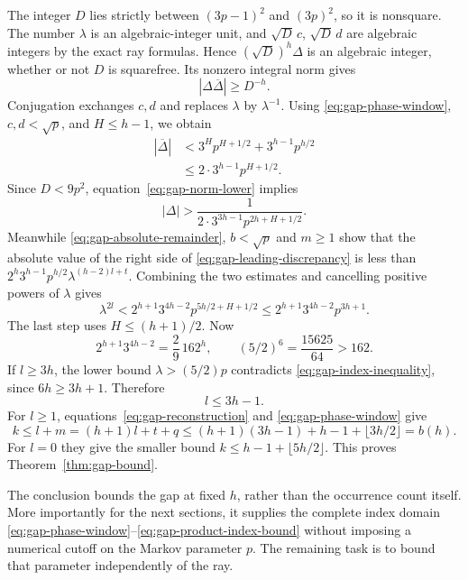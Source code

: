 The integer $D$ lies strictly between $(3p-1)^2$ and $(3p)^2$, so it
is nonsquare. The number $\lambda$ is an algebraic-integer unit, and
$\sqrt D\,c$, $\sqrt D\,d$ are algebraic integers by the exact ray
formulas. Hence $(\sqrt D)^h\Delta$ is an algebraic integer, whether
or not $D$ is squarefree. Its nonzero integral norm gives
\begin{equation}\label{eq:gap-norm-lower}
 |\Delta\overline\Delta|\geqslant D^{-h}.
\end{equation}
Conjugation exchanges $c,d$ and replaces $\lambda$ by $\lambda^{-1}$.
Using \eqref{eq:gap-phase-window}, $c,d<\sqrt p$, and
$H\leqslant h-1$, we obtain
\begin{align*}
 |\overline\Delta|
 &<3^H p^{H+1/2}+3^{h-1}p^{h/2}\\
 &\leqslant2\cdot3^{h-1}p^{H+1/2}.
\end{align*}
Since $D<9p^2$, equation~\eqref{eq:gap-norm-lower} implies
\begin{equation}\label{eq:gap-discrepancy-lower}
 |\Delta|>
 \frac1{2\cdot3^{3h-1}p^{2h+H+1/2}}.
\end{equation}
Meanwhile \eqref{eq:gap-absolute-remainder}, $b<\sqrt p$ and
$m\geqslant1$ show that the absolute value of the right side of
\eqref{eq:gap-leading-discrepancy} is less than
$2^h3^{h-1}p^{h/2}\lambda^{(h-2)l+t}$. Combining the two estimates
and cancelling positive powers of $\lambda$ gives
\begin{equation}\label{eq:gap-index-inequality}
 \lambda^{2l}
 <2^{h+1}3^{4h-2}p^{5h/2+H+1/2}
 \leqslant2^{h+1}3^{4h-2}p^{3h+1}.
\end{equation}
The last step uses $H\leqslant(h+1)/2$. Now
$$
 2^{h+1}3^{4h-2}=\frac29\,162^h,
 \qquad (5/2)^6=\frac{15625}{64}>162.
$$
If $l\geqslant3h$, the lower bound $\lambda>(5/2)p$ contradicts
\eqref{eq:gap-index-inequality}, since $6h\geqslant3h+1$. Therefore
\begin{equation}\label{eq:gap-product-index-bound}
 l\leqslant3h-1.
\end{equation}
For $l\geqslant1$, equations~\eqref{eq:gap-reconstruction} and
\eqref{eq:gap-phase-window} give
$$
 k\leqslant l+m=(h+1)l+t+q
 \leqslant(h+1)(3h-1)+h-1+\lfloor3h/2\rfloor=b(h).
$$
For $l=0$ they give the smaller bound
$k\leqslant h-1+\lfloor5h/2\rfloor$. This proves
Theorem~\ref{thm:gap-bound}.

The conclusion bounds the gap at fixed $h$, rather than the occurrence
count itself. More importantly for the next sections, it supplies the
complete index domain \eqref{eq:gap-phase-window}--\eqref{eq:gap-product-index-bound}
without imposing a numerical cutoff on the Markov parameter $p$.
The remaining task is to bound that parameter independently of the ray.
